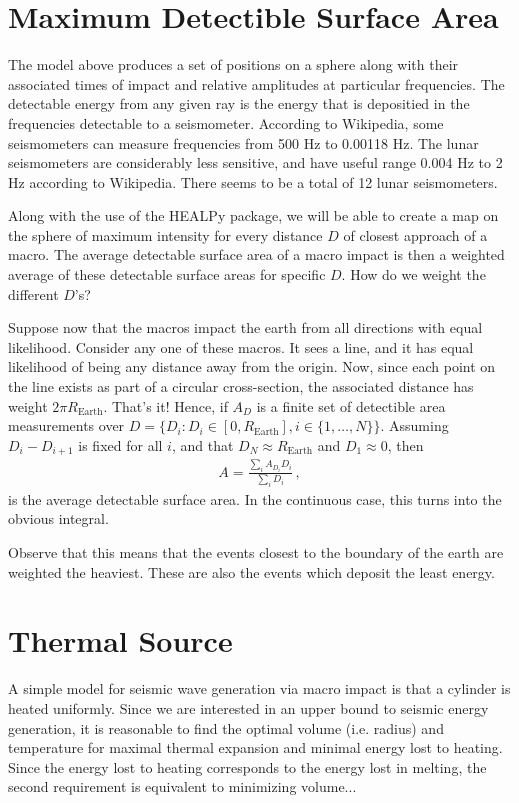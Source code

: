 \documentclass{article}
\newcommand*\te[1]{\text{#1}}
\newcommand*\f[2]{\frac{#1}{#2}}
\begin{document}
\section{Maximum Detectible Surface Area}
\indent

The model above produces a set of positions on a sphere along with their associated times of impact and relative amplitudes at particular frequencies. The detectable energy from any given ray is the energy that is depositied in the frequencies detectable to a seismometer. According to Wikipedia, some seismometers can measure frequencies from 500 Hz to 0.00118 Hz. The lunar seismometers are considerably less sensitive, and have useful range 0.004 Hz to 2 Hz according to Wikipedia. There seems to be a total of 12 lunar seismometers.

Along with the use of the HEALPy package, we will be able to create a map on the sphere of maximum intensity for every distance $D$ of closest approach of a macro. The average detectable surface area of a macro impact is then a weighted average of these detectable surface areas for specific $D$. How do we weight the different $D$'s?

Suppose now that the macros impact the earth from all directions with equal likelihood. Consider any one of these macros. It sees a line, and it has equal likelihood of being any distance away from the origin. Now, since each point on the line exists as part of a circular cross-section, the associated distance has weight $2\pi R_{\te{Earth}}$. That's it! Hence, if $A_D$ is a finite set of detectible area measurements over $D = \{D_i:D_i\in[0,R_\te{Earth}],i\in\{1,\dots,N\}\}$. Assuming $D_i - D_{i+1}$ is fixed for all $i$, and that $D_N\approx R_{\te{Earth}}$ and $D_1 \approx 0$, then 
\begin{align}
A=\f{\sum_i A_{D_i}D_i}{\sum_i D_i}\,,
\end{align}
is the average detectable surface area. In the continuous case, this turns into the obvious integral.

Observe that this means that the events closest to the boundary of the earth are weighted the heaviest. These are also the events which deposit the least energy.

\pagebreak
\section{Thermal Source}
A simple model for seismic wave generation via macro impact is that a cylinder is heated uniformly. Since we are interested in an upper bound to seismic energy generation, it is reasonable to find the optimal volume (i.e. radius) and temperature for maximal thermal expansion and minimal energy lost to heating. Since the energy lost to heating corresponds to the energy lost in melting, the second requirement is equivalent to minimizing volume... 
\pagebreak
\end{document}
